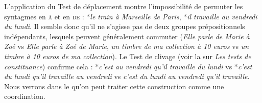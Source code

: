 {  L'application du Test de déplacement montre l’impossibilité de permuter les syntagmes en \textsc{à} et en \textsc{de} : *\textit{le train à Marseille de Paris}, *\textit{il travaille au vendredi du lundi}. Il semble donc qu’il ne s’agisse pas de deux groupes prépositionnels indépendants, lesquels peuvent généralement commuter (\textit{Elle parle de Marie à Zoé} vs \textit{Elle parle à Zoé de Marie}, \textit{un timbre de ma collection à 10 euros} vs \textit{un timbre à 10 euros de ma collection}). Le Test de clivage (voir la  sur \textit{Les tests de constituance}) confirme cela : *\textit{c’est au vendredi qu’il travaille du lundi} vs *\textit{c’est du lundi qu’il travaille au vendredi} vs \textit{c’est du lundi au vendredi qu’il travaille}. Nous verrons dans le  qu’on peut traiter cette construction comme une coordination.
}
